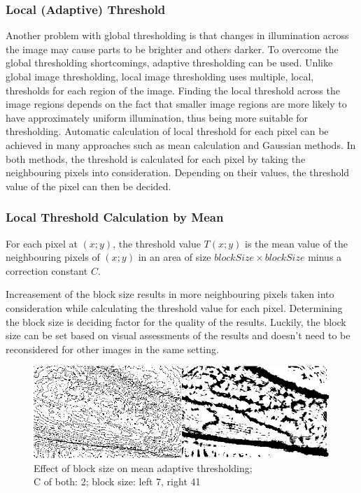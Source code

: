 \subsubsection{Local (Adaptive) Threshold}
Another problem with global thresholding is that changes in illumination across the image may cause parts to be brighter and others darker. To overcome the global thresholding shortcomings, adaptive thresholding can be used. 
Unlike global image thresholding, local image thresholding uses multiple, local, thresholds for each region of the image. Finding the local threshold across the image regions depends on the fact that smaller image regions are more likely to have approximately uniform illumination, thus being more suitable for thresholding. Automatic calculation of local threshold for each pixel can be achieved in many approaches such as mean calculation and Gaussian methods. In both methods, the threshold is calculated for each pixel by taking the neighbouring pixels into consideration. Depending on their values, the threshold value of the pixel can then be decided.

\subsubsection{Local Threshold Calculation by Mean}
For each pixel at $(x; y)$, the threshold value $T(x; y)$ is the mean value of the neighbouring pixels of $(x; y)$ in an area of size $blockSize \times blockSize$ minus a correction constant $C$. 

Increasement of the block size results in more neighbouring pixels taken into consideration while calculating the threshold value for each pixel. Determining the block size is deciding factor for the quality of the results. Luckily, the block size can be set based on visual assessments of the results and doesn’t need to be reconsidered for other images in the same setting. 

\begin{figure}[H]
\centering
\includegraphics[scale=0.8]{figures/compare1.JPG}
\captionsetup{justification=centering}
\caption[Effect of block size on mean adaptive thresholding]{Effect of block size on mean adaptive thresholding;\\C of both: 2; block size: left 7, right 41}\label{fig:compare1}
\end{figure}

